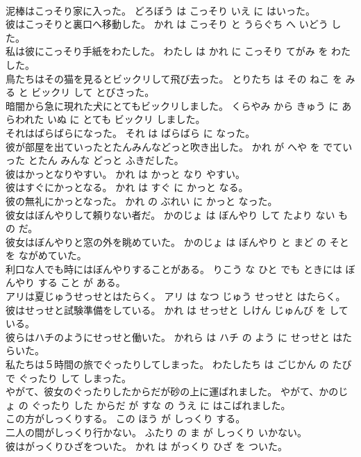 \documentclass[8pt]{extreport}
\begin{document}
\begin{CJK}{UTF8}{min}
\\	泥棒はこっそり家に入った。	どろぼう は こっそり いえ に はいった。	
\\	彼はこっそりと裏口へ移動した。	かれ は こっそり と うらぐち へ いどう した。	
\\	私は彼にこっそり手紙をわたした。	わたし は かれ に こっそり てがみ を わたした。	
\\	鳥たちはその猫を見るとビックリして飛び去った。	とりたち は その ねこ を みる と ビックリ して とびさった。	
\\	暗闇から急に現れた犬にとてもビックリしました。	くらやみ から きゅう に あらわれた いぬ に とても ビックリ しました。	
\\	それはばらばらになった。	それ は ばらばら に なった。	
\\	彼が部屋を出ていったとたんみんなどっと吹き出した。	かれ が へや を でていった とたん みんな どっと ふきだした。	
\\	彼はかっとなりやすい。	かれ は かっと なり やすい。	
\\	彼はすぐにかっとなる。	かれ は すぐ に かっと なる。	
\\	彼の無礼にかっとなった。	かれ の ぶれい に かっと なった。	
\\	彼女はぼんやりして頼りない者だ。	かのじょ は ぼんやり して たより ない もの だ。	
\\	彼女はぼんやりと窓の外を眺めていた。	かのじょ は ぼんやり と まど の そと を ながめていた。	
\\	利口な人でも時にはぼんやりすることがある。	りこう な ひと でも ときには ぼんやり する こと が ある。	
\\	アリは夏じゅうせっせとはたらく。	アリ は なつ じゅう せっせと はたらく。	
\\	彼はせっせと試験準備をしている。	かれ は せっせと しけん じゅんび を している。	
\\	彼らはハチのようにせっせと働いた。	かれら は ハチ の よう に せっせと はたらいた。	
\\	私たちは５時間の旅でぐったりしてしまった。	わたしたち は ごじかん の たび で ぐったり して しまった。	
\\	やがて、彼女のぐったりしたからだが砂の上に運ばれました。	やがて、かのじょ の ぐったり した からだ が すな の うえ に はこばれました。	
\\	この方がしっくりする。	この ほう が しっくり する。	
\\	二人の間がしっくり行かない。	ふたり の ま が しっくり いかない。	
\\	彼はがっくりひざをついた。	かれ は がっくり ひざ を ついた。	

\end{CJK}
\end{document}

